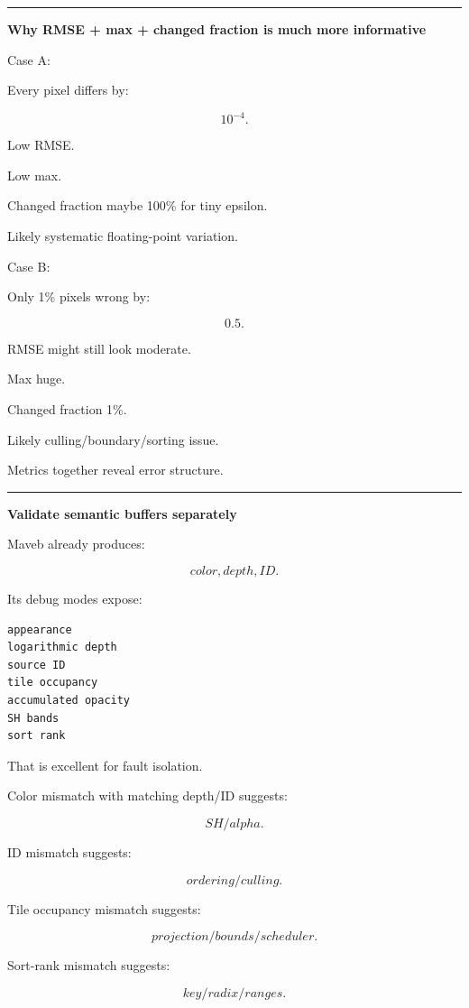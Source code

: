 \begin{center}\rule{0.5\linewidth}{0.5pt}\end{center}

\textbf{Why RMSE + max + changed fraction is much more informative}

Case A:

Every pixel differs by:

\[
10^{-4}.
\]

Low RMSE.

Low max.

Changed fraction maybe 100\% for tiny epsilon.

Likely systematic floating-point variation.

Case B:

Only 1\% pixels wrong by:

\[
0.5.
\]

RMSE might still look moderate.

Max huge.

Changed fraction 1\%.

Likely culling/boundary/sorting issue.

Metrics together reveal error structure.

\begin{center}\rule{0.5\linewidth}{0.5pt}\end{center}

\textbf{Validate semantic buffers separately}

Maveb already produces:

\[
color,
depth,
ID.
\]

Its debug modes expose:

\protect{}\label{zp6hzo}%
\begin{verbatim}
appearance
logarithmic depth
source ID
tile occupancy
accumulated opacity
SH bands
sort rank
\end{verbatim}

That is excellent for fault isolation.

Color mismatch with matching depth/ID suggests:

\[
SH/alpha.
\]

ID mismatch suggests:

\[
ordering/culling.
\]

Tile occupancy mismatch suggests:

\[
projection/bounds/scheduler.
\]

Sort-rank mismatch suggests:

\[
key/radix/ranges.
\]

